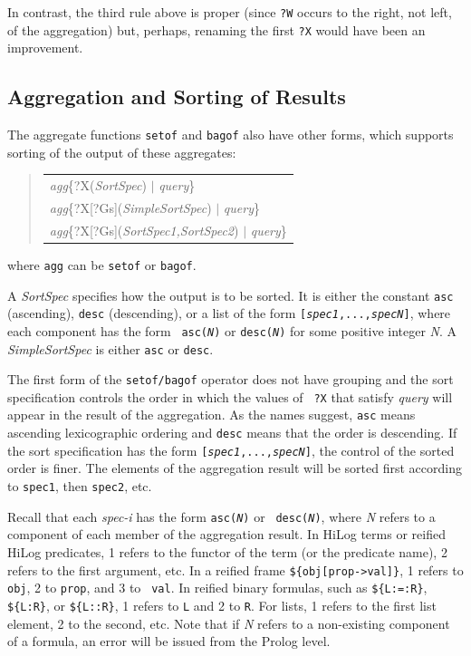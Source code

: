 \documentclass[11pt]{article}
\newenvironment{qrules}{\begin{quote}\tt\begin{tabular}[t]{l}}%
{\end{tabular}\end{quote}}
\begin{document}
In contrast, the third rule above is proper (since \texttt{?W} occurs to
the right, not left, of the aggregation)
but, perhaps, renaming the first \texttt{?X} would have been an
improvement.



\subsection {Aggregation and Sorting of Results}\label{sec-agg-sort}

The aggregate functions {\tt setof} and {\tt bagof}
also have other forms, which supports sorting of the output of these
aggregates:  
\begin{qrules}
\textnormal{\emph{agg}}\{?X({\it SortSpec}) $|$ {\it query}\}\\
\textnormal{\emph{agg}}\{?X[?Gs]({\it SimpleSortSpec}) $|$ {\it query}\}\\
\textnormal{\emph{agg}}\{?X[?Gs]({\it SortSpec1,SortSpec2}) $|$ {\it query}\}
\end{qrules}
where {\tt agg} can be {\tt setof} or {\tt bagof}.

A {\it SortSpec} specifies how the output is to be sorted. It is either the
constant {\tt asc} (ascending), {\tt desc} (descending), or a list of the
form {\tt [{\it spec1},...,{\it specN}]}, where each component has the form {\tt
  asc({\it N})} or {\tt desc({\it N})} for some positive integer {\it N}.      
A {\it SimpleSortSpec} is either {\tt asc} or {\tt desc}.   

The first form of the {\tt setof/bagof} operator does not have grouping 
and the sort specification controls the order in which the values of {\tt
  ?X} that satisfy {\it query} will appear in the result of the aggregation.
As the names suggest, {\tt asc} means ascending
lexicographic ordering and {\tt desc} means that the order is descending.  
If the sort specification has the form {\tt [{\it spec1},...,{\it specN}]},
the control of the sorted order is finer. The elements of the aggregation
result will be sorted first according to {\tt spec1}, then {\tt spec2}, etc.

Recall that each \emph{spec-i}  has the form {\tt asc({\it N})} or {\tt
  desc({\it N})}, where \emph{N} refers to a component of each
member of the aggregation result. In HiLog terms or reified HiLog
predicates, 1 refers to the functor of the term
(or the predicate name), 2 refers to the first argument, etc. In a reified frame
{\tt \$\{obj[prop->val]\}}, 1 refers to {\tt obj}, 2 to {\tt prop}, and 3 to {\tt
  val}. In reified binary formulas, such as {\tt \$\{L:=:R\}}, {\tt \$\{L:R\}}, or {\tt \$\{L::R\}},
1 refers to {\tt L} and 2 to {\tt R}.  
For lists, 1 refers to the first list element, 2 to the second, etc.
Note that if {\it N} refers to a non-existing component of a formula, an
error will be issued from the Prolog level.
\end{document}
